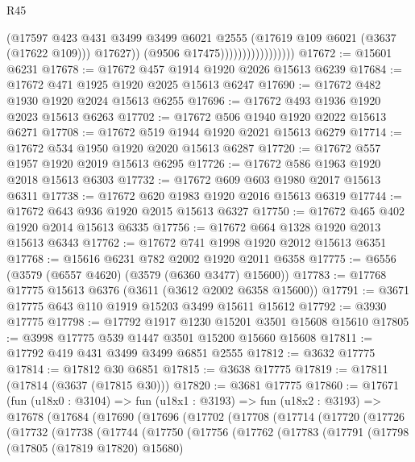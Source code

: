 \begin{lexlean}{R45}
\begin{coremodule}
                                      (@17597
                                        @423
                                        @431
                                        @3499
                                        @3499
                                        @6021
                                        @2555
                                        (@17619 @109 @6021 (@3637 (@17622 @109)))
                                        @17627))
                                    (@9506 @17475)))))))))))))))))
@17672 := @15601 @6231
@17678 := @17672 @457 @1914 @1920 @2026 @15613 @6239
@17684 := @17672 @471 @1925 @1920 @2025 @15613 @6247
@17690 := @17672 @482 @1930 @1920 @2024 @15613 @6255
@17696 := @17672 @493 @1936 @1920 @2023 @15613 @6263
@17702 := @17672 @506 @1940 @1920 @2022 @15613 @6271
@17708 := @17672 @519 @1944 @1920 @2021 @15613 @6279
@17714 := @17672 @534 @1950 @1920 @2020 @15613 @6287
@17720 := @17672 @557 @1957 @1920 @2019 @15613 @6295
@17726 := @17672 @586 @1963 @1920 @2018 @15613 @6303
@17732 := @17672 @609 @603 @1980 @2017 @15613 @6311
@17738 := @17672 @620 @1983 @1920 @2016 @15613 @6319
@17744 := @17672 @643 @936 @1920 @2015 @15613 @6327
@17750 := @17672 @465 @402 @1920 @2014 @15613 @6335
@17756 := @17672 @664 @1328 @1920 @2013 @15613 @6343
@17762 := @17672 @741 @1998 @1920 @2012 @15613 @6351
@17768 := @15616 @6231 @782 @2002 @1920 @2011 @6358
@17775 := @6556 (@3579 (@6557 @4620) (@3579 (@6360 @3477) @15600))
@17783 := @17768 @17775 @15613 @6376 (@3611 (@3612 @2002 @6358 @15600))
@17791 := @3671 @17775 @643 @110 @1919 @15203 @3499 @15611 @15612
@17792 := @3930 @17775
@17798 := @17792 @1917 @1230 @15201 @3501 @15608 @15610
@17805 := @3998 @17775 @539 @1447 @3501 @15200 @15660 @15608
@17811 := @17792 @419 @431 @3499 @3499 @6851 @2555
@17812 := @3632 @17775
@17814 := @17812 @30 @6851
@17815 := @3638 @17775
@17819 := @17811 (@17814 (@3637 (@17815 @30)))
@17820 := @3681 @17775
@17860 := @17671
    (fun (u18x0 : @3104) =>
    fun (u18x1 : @3193) =>
    fun (u18x2 : @3193) =>
    @17678
      (@17684
        (@17690
          (@17696
            (@17702
              (@17708
                (@17714
                  (@17720
                    (@17726
                      (@17732
                        (@17738
                          (@17744
                            (@17750
                              (@17756
                                (@17762
                                  (@17783
                                    (@17791
                                      (@17798
                                        (@17805 (@17819 @17820) @15680)

\end{coremodule}
\end{lexlean}
